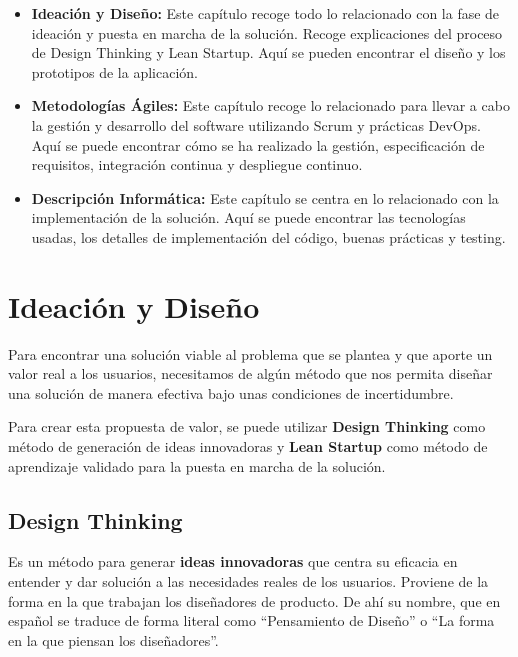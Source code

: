 \documentclass[12pt,twoside,titlepage]{report}
\newcommand\blankpage{%
    \newpage
    \null
    \thispagestyle{empty}%
    \newpage}
\begin{document}
\begin{itemize}
    \item \textbf{Ideación y Diseño:} Este capítulo recoge todo lo relacionado con la fase de ideación y puesta en marcha de la solución. Recoge explicaciones del proceso de Design Thinking y Lean Startup. Aquí se pueden encontrar el diseño y los prototipos de la aplicación.
    \item \textbf{Metodologías Ágiles:} Este capítulo recoge lo relacionado para llevar a cabo la gestión y desarrollo del software utilizando Scrum y prácticas DevOps. Aquí se puede encontrar cómo se ha realizado la gestión, especificación de requisitos, integración continua y despliegue continuo.
    \item \textbf{Descripción Informática:} Este capítulo se centra en lo relacionado con la implementación de la solución. Aquí se puede encontrar las tecnologías usadas, los detalles de implementación del código, buenas prácticas y testing.
\end{itemize}





\chapter{Ideación y Diseño}

Para encontrar una solución viable al problema que se plantea y que aporte un valor real a los usuarios, necesitamos de algún método que nos permita diseñar una solución de manera efectiva bajo unas condiciones de incertidumbre.

Para crear esta propuesta de valor, se puede utilizar \textbf{Design Thinking} como método de generación de ideas innovadoras y \textbf{Lean Startup} como método de aprendizaje validado para la puesta en marcha de la solución.

\section{Design Thinking}

Es un método para generar \textbf{ideas innovadoras} que centra su eficacia en entender y dar solución a las necesidades reales de los usuarios. Proviene de la forma en la que trabajan los diseñadores de producto. De ahí su nombre, que en español se traduce de forma literal como ``Pensamiento de Diseño'' o ``La forma en la que piensan los diseñadores''.
\end{document}
